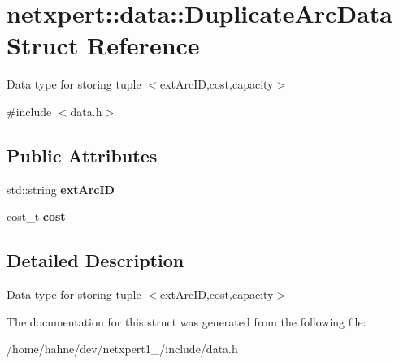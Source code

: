 \hypertarget{structnetxpert_1_1data_1_1DuplicateArcData}{}\section{netxpert\+:\+:data\+:\+:Duplicate\+Arc\+Data Struct Reference}
\label{structnetxpert_1_1data_1_1DuplicateArcData}


Data type for storing tuple $<$ext\+Arc\+ID,cost,capacity$>$  




{\ttfamily \#include $<$data.\+h$>$}

\subsection*{Public Attributes}
\begin{DoxyCompactItemize}
\item 
std\+::string {\bfseries ext\+Arc\+ID}\hypertarget{structnetxpert_1_1data_1_1DuplicateArcData_a389b60d12409b276c52e9fdcf3e3028a}{}\label{structnetxpert_1_1data_1_1DuplicateArcData_a389b60d12409b276c52e9fdcf3e3028a}

\item 
cost\+\_\+t {\bfseries cost}\hypertarget{structnetxpert_1_1data_1_1DuplicateArcData_afe676d824fbb93406e61d9f8461d205e}{}\label{structnetxpert_1_1data_1_1DuplicateArcData_afe676d824fbb93406e61d9f8461d205e}

\end{DoxyCompactItemize}


\subsection{Detailed Description}
Data type for storing tuple $<$ext\+Arc\+ID,cost,capacity$>$ 

The documentation for this struct was generated from the following file\+:\begin{DoxyCompactItemize}
\item 
/home/hahne/dev/netxpert1\+\_/include/data.\+h\end{DoxyCompactItemize}
